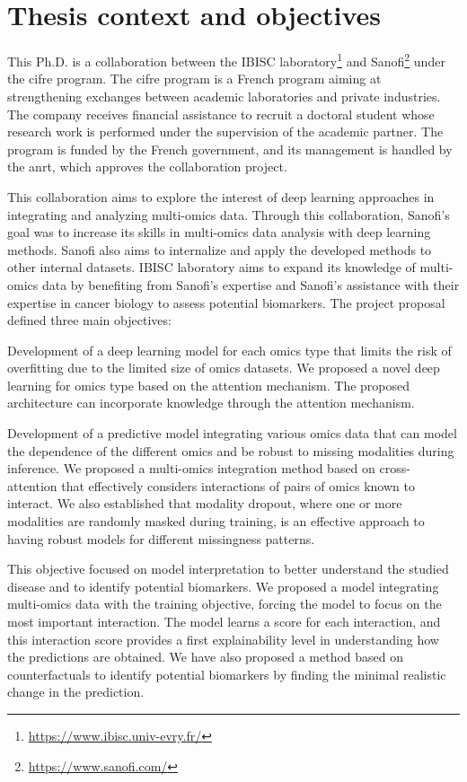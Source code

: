 \documentclass[../main.tex]{subfiles}
\begin{document}
\section{Thesis context and objectives}
	This Ph.D. is a collaboration between the IBISC laboratory\footnote{\url{https://www.ibisc.univ-evry.fr/}} and Sanofi\footnote{\url{https://www.sanofi.com/}} under the \gls{cifre} program.
	The \gls{cifre} program is a French program aiming at strengthening exchanges between academic laboratories and private industries.
	The company receives financial assistance to recruit a doctoral student whose research work is performed under the supervision of the academic partner.
	The program is funded by the French government, and its management is handled by the \gls{anrt}, which approves the collaboration project.

	This collaboration aims to explore the interest of deep learning approaches in integrating and analyzing multi-omics data.
	Through this collaboration, Sanofi's goal was to increase its skills in multi-omics data analysis with deep learning methods.
	Sanofi also aims to internalize and apply the developed methods to other internal datasets.
	IBISC laboratory aims to expand its knowledge of multi-omics data by benefiting from Sanofi's expertise and Sanofi's assistance with their expertise in cancer biology to assess potential biomarkers.
	The project proposal defined three main objectives:
	\begin{description}[
			style=multiline,
			leftmargin=!,
			labelwidth=2cm
		]
		\item[First objective]
			Development of a deep learning model for each omics type that limits the risk of overfitting due to the limited size of omics datasets.
			We proposed a novel deep learning for omics type based on the attention mechanism.
			The proposed architecture can incorporate knowledge through the attention mechanism.
		\item[Second objective]
			Development of a predictive model integrating various omics data that can model the dependence of the different omics and be robust to missing modalities during inference.
			We proposed a multi-omics integration method based on cross-attention that effectively considers interactions of pairs of omics known to interact.
			We also established that modality dropout, where one or more modalities are randomly masked during training, is an effective approach to having robust models for different missingness patterns.
		\item[Third objective]
			This objective focused on model interpretation to better understand the studied disease and to identify potential biomarkers.
			We proposed a model integrating multi-omics data with the training objective, forcing the model to focus on the most important interaction.
			The model learns a score for each interaction, and this interaction score provides a first explainability level in understanding how the predictions are obtained.
			We have also proposed a method based on counterfactuals to identify potential biomarkers by finding the minimal realistic change in the prediction.
	\end{description}
\end{document}
